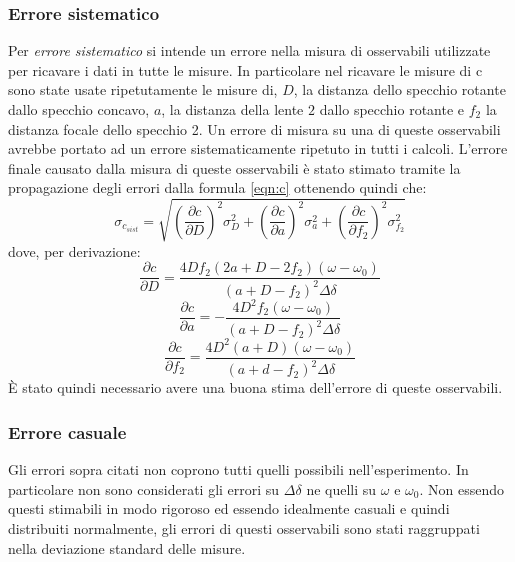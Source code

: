 \documentclass[a4paper,11pt]{article}
\begin{document}
	\subsubsection{Errore sistematico}
	Per \emph{errore sistematico} si intende un errore nella misura di osservabili utilizzate per ricavare i dati in tutte le misure. In particolare nel ricavare le misure di c sono state usate ripetutamente le misure di, $ D $, la distanza dello specchio rotante dallo specchio concavo, $ a $, la distanza della lente $ 2 $ dallo specchio rotante e $ f_2 $ la distanza focale dello specchio 2. Un errore di misura su una di queste osservabili avrebbe portato ad un errore sistematicamente ripetuto in tutti i calcoli. L'errore finale causato dalla misura di queste osservabili è stato stimato tramite la propagazione degli errori dalla formula \ref{eqn:c} ottenendo quindi che:
	\begin{equation}\label{eqn:sigmac}
		\sigma_{c_{sist}} = \sqrt{\left(\frac{\partial c}{\partial D}\right)^2\sigma_D^2+
			\left(\frac{\partial c}{\partial a}\right)^2\sigma_a^2+\left(\frac{\partial c}{\partial f_2}\right)^2\sigma_{f_2}^2}
	\end{equation}
	dove, per derivazione:
	\begin{equation}\label{eqn:cderivD}
		\frac{\partial c}{\partial D}=\dfrac{4Df_2(2a+D-2f_2)(\omega-\omega_0)}{(a+D-f_2)^2\Delta\delta}
	\end{equation}
	\begin{equation}\label{eqn:deriva}
		\frac{\partial c}{\partial a} = - \dfrac{4D^2f_2(\omega-\omega_0)}{\left(a+D-f_2\right)^2\Delta\delta}
	\end{equation}
	\begin{equation}\label{eqn:derivf2}
		\frac{\partial c}{\partial f_2}=\frac{4D^2(a+D)(\omega-\omega_0)}{(a+d-f_2)^2\Delta\delta}
	\end{equation}
	È stato quindi necessario avere una buona stima dell'errore di queste osservabili. \\
	
	\subsubsection{Errore casuale}
	Gli errori sopra citati non coprono tutti quelli possibili nell'esperimento. In particolare non sono considerati gli errori su $ \Delta\delta $ ne quelli su $ \omega $ e $ \omega_0 $.	Non essendo questi stimabili in modo rigoroso ed essendo idealmente casuali e quindi distribuiti normalmente, gli errori di questi osservabili sono stati raggruppati nella deviazione standard delle misure.
	
\end{document}
